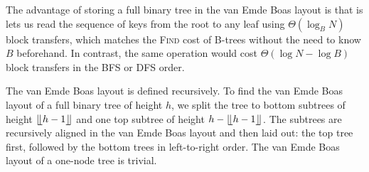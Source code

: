 The advantage of storing a full binary tree in the van Emde Boas layout
is that is lets us read the sequence of keys from the root to any leaf
using $\Theta(\log_B N)$ block transfers, which matches the \textsc{Find}
cost of B-trees without the need to know $B$ beforehand.
In contrast, the same operation would cost $\Theta(\log N-\log B)$ block
transfers in the BFS or DFS order.

The van Emde Boas layout is defined recursively. To find the van Emde Boas layout
of a full binary tree of height $h$, we split the tree to bottom subtrees
of height $\lfloor \kern -0.22em \lfloor h-1 \rfloor \kern -0.22em \rfloor$ and one top subtree of height $h - \lfloor \kern -0.22em \lfloor
h-1 \rfloor \kern -0.22em \rfloor$.
The subtrees are recursively aligned in the van Emde Boas layout and then laid
out: the top tree first, followed by the bottom trees in left-to-right order.
The van Emde Boas layout of a one-node tree is trivial.

